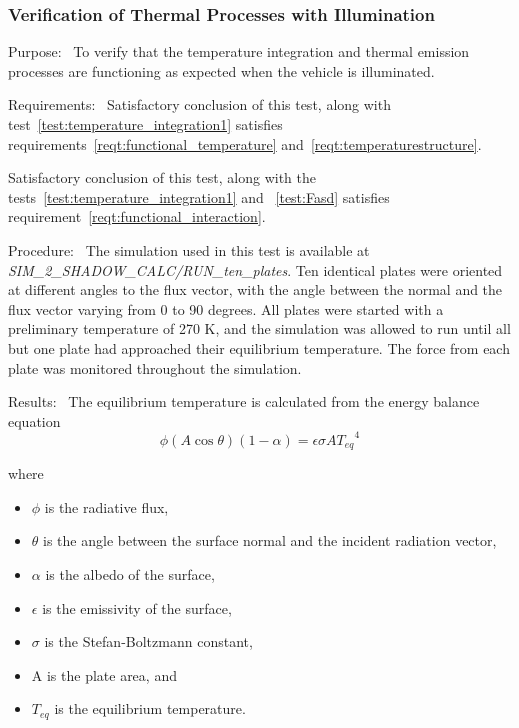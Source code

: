  \subsubsection{Verification of Thermal Processes with Illumination}
  \label{test:temperature_integration2}
  \begin{description}
  \item{Purpose:}\ \newline
    To verify that the temperature integration and thermal emission processes
    are functioning as expected when the vehicle is illuminated.
  \item{Requirements:}\ \newline
    Satisfactory conclusion of this test, along with test~\ref{test:temperature_integration1} satisfies requirements~\ref{reqt:functional_temperature} and~\ref{reqt:temperaturestructure}.

    Satisfactory conclusion of this test, along with the tests~\ref{test:temperature_integration1} and ~\ref{test:Fasd} satisfies requirement~\ref{reqt:functional_interaction}.
  \item{Procedure:}\ \newline
  The simulation used in this test is available at \textit{SIM\_2\_SHADOW\_CALC/RUN\_ten\_plates}.
    Ten identical plates were oriented at different angles to the flux
    vector, with the angle between the normal and the flux vector varying
    from 0 to 90 degrees.  All plates were started with a preliminary
    temperature of 270 K, and the simulation was allowed to run until all but
    one plate had approached their equilibrium temperature.  The force from each plate
    was monitored throughout the simulation.
  \item{Results:}\ \newline
    The equilibrium temperature is calculated from the energy balance equation
    \begin{equation}
      \phi (A\cos \theta )(1-\alpha )=\epsilon \sigma A{T_{\mathit{eq}}}^{4}
    \end{equation}

    where
    \begin{itemize}
      \item{}
        $\phi$ is the radiative flux,
      \item{}
        $\theta$ is the angle between the surface normal and the incident
        radiation vector,
      \item{}
        $\alpha$ is the albedo of the surface,
      \item{}
        $\epsilon$ is the emissivity of the surface,
      \item{}
        $\sigma$ is the Stefan-Boltzmann constant,
      \item{}
        A is the plate area, and
      \item{}
        $T_{\mathit{eq}}$ is the equilibrium temperature.
    \end{itemize}


\end{description}
